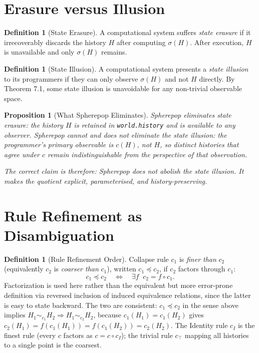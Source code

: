 \documentclass[12pt, a4paper, openany]{book}
\theoremstyle{plain}
\newtheorem{proposition}[theorem]{Proposition}
\theoremstyle{definition}
\newtheorem{definition}[theorem]{Definition}
\theoremstyle{remark}
\begin{document}
\section{Erasure versus Illusion}

\begin{definition}[State Erasure]
A computational system suffers \emph{state erasure} if it irrecoverably discards
the history $H$ after computing $\sigma(H)$. After execution, $H$ is unavailable
and only $\sigma(H)$ remains.
\end{definition}

\begin{definition}[State Illusion]
\label{def:state-illusion}
A computational system presents a \emph{state illusion} to its programmers if
they can only observe $\sigma(H)$ and not $H$ directly. By Theorem 7.1, some
state illusion is unavoidable for any non-trivial observable space.
\end{definition}

\begin{proposition}[What Spherepop Eliminates]
Spherepop eliminates state erasure: the history $H$ is retained in
\texttt{world.history} and is available to any observer. Spherepop cannot and
does not eliminate the state illusion: the programmer's primary observable is
$c(H)$, not $H$, so distinct histories that agree under $c$ remain
indistinguishable from the perspective of that observation.

The correct claim is therefore: Spherepop does not abolish the state illusion.
It makes the quotient explicit, parameterised, and history-preserving.
\end{proposition}

\section{Rule Refinement as Disambiguation}

\begin{definition}[Rule Refinement Order]
\label{def:refinement-order}
Collapse rule $c_1$ is \emph{finer than} $c_2$ (equivalently $c_2$ is
\emph{coarser than} $c_1$), written $c_1 \preceq c_2$, if $c_2$ factors through
$c_1$:
\[
c_1 \preceq c_2 \quad\Longleftrightarrow\quad \exists f \;\; c_2 = f \circ c_1.
\]
Factorization is used here rather than the equivalent but more error-prone
definition via reversed inclusion of induced equivalence relations, since the
latter is easy to state backward. The two are consistent: $c_1 \preceq c_2$ in
the sense above implies $H_1 \sim_{c_1} H_2 \Rightarrow H_1 \sim_{c_2} H_2$,
because $c_1(H_1) = c_1(H_2)$ gives $c_2(H_1) = f(c_1(H_1)) = f(c_1(H_2)) =
c_2(H_2)$. The Identity rule $c_I$ is the finest rule (every $c$ factors as
$c = c \circ c_I$); the trivial rule $c_\top$ mapping all histories to a single
point is the coarsest.
\end{definition}
\end{document}
